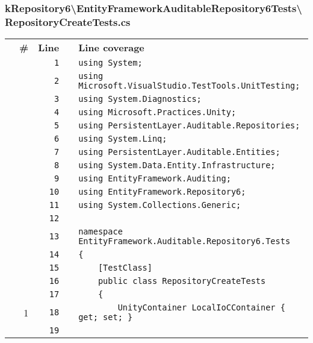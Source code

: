\documentclass[a4paper,10pt]{article}
\begin{document}
\subsubsection{kRepository6\textbackslash EntityFrameworkAuditableRepository6Tests\textbackslash RepositoryCreateTests.cs}
\begin{longtable}[l]{lrrll}
\textbf{} & \textbf{\#} & \textbf{Line} & \textbf{} & \textbf{Line coverage}\\
\cellcolor{gray} &  & \verb~1~ & & \verb~using System;~\\
\cellcolor{gray} &  & \verb~2~ & & \verb~using Microsoft.VisualStudio.TestTools.UnitTesting;~\\
\cellcolor{gray} &  & \verb~3~ & & \verb~using System.Diagnostics;~\\
\cellcolor{gray} &  & \verb~4~ & & \verb~using Microsoft.Practices.Unity;~\\
\cellcolor{gray} &  & \verb~5~ & & \verb~using PersistentLayer.Auditable.Repositories;~\\
\cellcolor{gray} &  & \verb~6~ & & \verb~using System.Linq;~\\
\cellcolor{gray} &  & \verb~7~ & & \verb~using PersistentLayer.Auditable.Entities;~\\
\cellcolor{gray} &  & \verb~8~ & & \verb~using System.Data.Entity.Infrastructure;~\\
\cellcolor{gray} &  & \verb~9~ & & \verb~using EntityFramework.Auditing;~\\
\cellcolor{gray} &  & \verb~10~ & & \verb~using EntityFramework.Repository6;~\\
\cellcolor{gray} &  & \verb~11~ & & \verb~using System.Collections.Generic;~\\
\cellcolor{gray} &  & \verb~12~ & & \verb~~\\
\cellcolor{gray} &  & \verb~13~ & & \verb~namespace EntityFramework.Auditable.Repository6.Tests~\\
\cellcolor{gray} &  & \verb~14~ & & \verb~{~\\
\cellcolor{gray} &  & \verb~15~ & & \verb~    [TestClass]~\\
\cellcolor{gray} &  & \verb~16~ & & \verb~    public class RepositoryCreateTests~\\
\cellcolor{gray} &  & \verb~17~ & & \verb~    {~\\
\cellcolor{green} & 1 & \verb~18~ & & \verb~        UnityContainer LocalIoCContainer { get; set; }~\\
\cellcolor{gray} &  & \verb~19~ & & \verb~~\\

\end{longtable}
\end{document}
